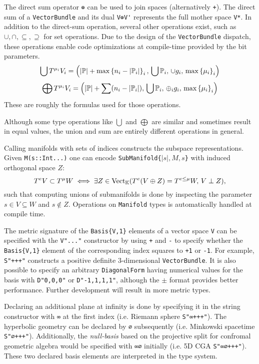 \documentclass{juliacon}
\begin{document}
The direct sum operator \verb`⊕` can be used to join spaces (alternatively \verb`+`).
The direct sum of a \verb`VectorBundle` and its dual \verb`V⊕V'` represents the full mother space \verb`V*`.
In addition to the direct-sum operation, several other operations exist, such as $\cup,\cap,\subseteq,\supseteq$ for set operations.
Due to the design of the \verb`VectorBundle` dispatch, these operations enable code optimizations at compile-time provided by the bit parameters.
$$ \bigcup T^{\mu_i}V_i = \left(|\mathbb{P}|+\max\left\{ n_i-|\mathbb{P}_i| \right\}_i,\, \bigcup \mathbb{P}_i,\, \cup g_i,\, \max\left\{ \mu_i \right\}_i\right) $$
$$ \bigoplus T^{\mu_i}V_i = \left(\left|\mathbb{P}\right|+\sum (n_i-|\mathbb{P}_i|),\, \bigcup \mathbb{P}_i,\, \oplus_i g_i,\,\max\left\{ \mu_i \right\}_i\right) $$
These are roughly the formulas used for those operations.
\begin{remark}
	Although some type operations like $\bigcup$ and $\bigoplus$ are similar and sometimes result in equal values, the union and sum are entirely different operations in general.
\end{remark}

Calling manifolds with sets of indices constructs the subspace representations.
Given \verb`M(s::Int...)` one can encode \verb+SubManifold{+$|s|,M,s$\verb+}+ with induced orthogonal space $Z$:
$$T^eV \subset T^\mu W \iff \exists Z\in\text{Vect}_{\mathbb{K}}(T^e(V\oplus Z) = T^{e\leq \mu}W,\,V\perp Z),$$
such that computing unions of submanifolds is done by inspecting the parameter $s\in V\subseteq W$ and $s\notin Z$. Operations on \verb`Manifold` types is automatically handled at compile time.

The metric signature of the \verb+Basis{V,1}+ elements of a vector space \verb+V+ can be specified with the \verb+V"..."+ constructor by using \verb-+- and \verb+-+ to specify whether the \verb+Basis{V,1}+ element of the corresponding index squares to \verb`+1` or \verb`-1`.
For example, \verb`S"+++"` constructs a positive definite 3-dimensional \verb`VectorBundle`.
It is also possible to specify an arbitrary \verb`DiagonalForm` having numerical values for the basis with \verb`D"0,0,0"` or \verb`D"-1,1,1,1"`, although the $\pm$ format provides better performance.
Further development will result in more metric types.

Declaring an additional plane at infinity is done by specifying it in the string constructor with \verb`∞` at the first index (i.e. Riemann sphere \verb`S"∞+++"`). The hyperbolic geometry can be declared by \verb`∅` subsequently (i.e. Minkowski spacetime \verb`S"∅+++"`). 
Additionally, the \textit{null-basis} based on the projective split for confromal geometric algebra would be specified with \verb`∞∅` initially (i.e. 5D CGA \verb`S"∞∅+++"`). These two declared basis elements are interpreted in the type system. %
\end{document}
